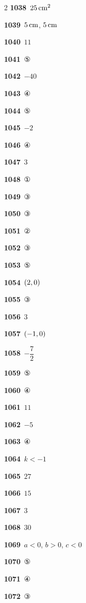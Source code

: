 \documentclass[10pt,a4paper]{article}
\begin{document}
\begin{multicols}{2}
\noindent\textbf{1038}\ $25\mkern3mu \mathrm{cm}^2$\par
\noindent\textbf{1039}\ $5\mkern3mu \mathrm{cm}$, $5\mkern3mu \mathrm{cm}$\par
\noindent\textbf{1040}\ $11$\par
\noindent\textbf{1041}\ ⑤\par
\noindent\textbf{1042}\ $-40$\par
\noindent\textbf{1043}\ ④\par
\noindent\textbf{1044}\ ⑤\par
\noindent\textbf{1045}\ $-2$\par
\noindent\textbf{1046}\ ④\par
\noindent\textbf{1047}\ $3$\par
\noindent\textbf{1048}\ ①\par
\noindent\textbf{1049}\ ③\par
\noindent\textbf{1050}\ ③\par
\noindent\textbf{1051}\ ②\par
\noindent\textbf{1052}\ ③\par
\noindent\textbf{1053}\ ⑤\par
\noindent\textbf{1054}\ $(2{,}\mkern3mu 0)$\par
\noindent\textbf{1055}\ ③\par
\noindent\textbf{1056}\ $3$\par
\noindent\textbf{1057}\ $(-1{,}\mkern3mu 0)$\par
\noindent\textbf{1058}\ $-\dfrac{7}{2}$\par
\noindent\textbf{1059}\ ⑤\par
\noindent\textbf{1060}\ ④\par
\noindent\textbf{1061}\ $11$\par
\noindent\textbf{1062}\ $-5$\par
\noindent\textbf{1063}\ ④\par
\noindent\textbf{1064}\ $k<-1$\par
\noindent\textbf{1065}\ $27$\par
\noindent\textbf{1066}\ $15$\par
\noindent\textbf{1067}\ $3$\par
\noindent\textbf{1068}\ $30$\par
\noindent\textbf{1069}\ $a<0$, $b>0$, $c<0$\par
\noindent\textbf{1070}\ ⑤\par
\noindent\textbf{1071}\ ④\par
\noindent\textbf{1072}\ ③\par

\end{multicols}
\end{document}
